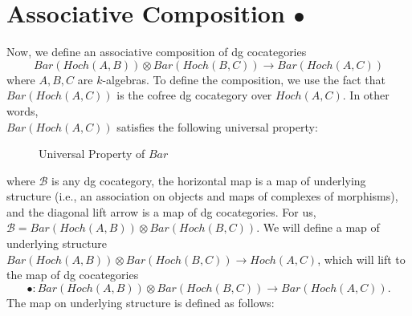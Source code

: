 \section{Associative Composition $\bullet$} \label{sec:assoc_comp}
Now, we define an associative composition of 
dg cocategories 
$$Bar(Hoch(A,B)) \otimes Bar(Hoch(B,C))
\to Bar(Hoch(A,C))$$
where $A,B,C$ are $k$-algebras. To define 
the composition, we use the fact that \\
$Bar(Hoch(A,C))$ is the cofree dg 
cocategory over $Hoch(A,C)$. In other words,\\
$Bar(Hoch(A,C))$ satisfies 
the following universal property:
%
\begin{figure}[H]
\centerline{}
\caption{Universal Property of $Bar$}	
\end{figure}  
where $\mathcal{B}$ is any dg cocategory, 
the horizontal map is a map of underlying 
structure (i.e., an association on objects 
and maps of complexes of morphisms), and the 
diagonal lift arrow is a map of dg cocategories. 
For us, $\mathcal{B} = Bar(Hoch(A,B)) 
\otimes Bar(Hoch(B,C))$. We will define a map of 
underlying structure $Bar(Hoch(A,B)) \otimes 
Bar(Hoch(B,C)) \to Hoch(A,C)$, which will lift 
to the map of dg cocategories 
$$\bullet: Bar(Hoch(A,B)) \otimes 
Bar(Hoch(B,C)) \to Bar(Hoch(A,C)).$$
The map on underlying structure is defined 
as follows:
%
